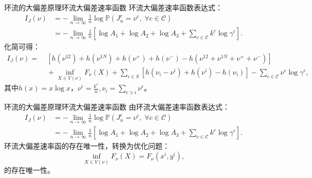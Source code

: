 \documentclass{beamer}
\begin{document}
\begin{frame}{环流的大偏差原理}{环流大偏差速率函数}
	环流大偏差速率函数表达式：
	\begin{equation*}
		\begin{split}
			I_J(\nu) &= -\lim_{n\to\infty}\frac{1}{n}\log\mathbb{P}\left(J^c_n=\nu^c,\;\forall c\in\mathcal{C}\right)\\
			&= -\lim_{n\to\infty}\frac{1}{n}\left[\log A_1+\log A_2+\log A_3+\sum_{c\in\mathcal{C}}k^c\log\gamma^c\right].
		\end{split}
	\end{equation*}
	化简可得：
	\begin{equation*}\label{ratefunction}
		\begin{split}
			I_J(\nu) =&\; \left[h\left(\nu^{12}\right)+h\left(\nu^{1N}\right)
				+h\left(\nu^+\right)+h\left(\nu^-\right)-h\left(\nu^{12}+\nu^{1N}+\nu^++\nu^-\right)\right] \\
			&\;+\inf_{X\in V(\nu)}F_{\nu}(X)+\sum_{i\in S}\left[ h\left(\nu_i-\nu^i\right)+h\left(\nu^i\right)
				-h\left(\nu_i\right)\right]-\sum_{c\in\mathcal{C}}\nu^c\log\gamma^c,
		\end{split}
	\end{equation*}
	其中$h(x) = x \log x$，$\nu^c = \frac{k^c}{n}, \nu_i=\sum_{c\ni i}\nu^c$。
\end{frame}

\begin{frame}{环流的大偏差原理}{环流大偏差速率函数}
	由环流大偏差速率函数表达式：
	\begin{equation*}
		\begin{split}
			I_J(\nu) &= -\lim_{n\to\infty}\frac{1}{n}\log\mathbb{P}\left(J^c_n=\nu^c,\;\forall c\in\mathcal{C}\right)\\
			&= -\lim_{n\to\infty}\frac{1}{n}\left[\log A_1+\log A_2+\log A_3+\sum_{c\in\mathcal{C}}k^c\log\gamma^c\right].
		\end{split}
	\end{equation*}
	环流大偏差速率函的存在唯一性，转换为优化问题：
	\begin{equation*}
		\inf_{X\in V(\nu)}F_{\nu}(X) = F_{\nu}(x^i,y^i),
	\end{equation*}
	的存在唯一性。
\end{frame}
\end{document}
